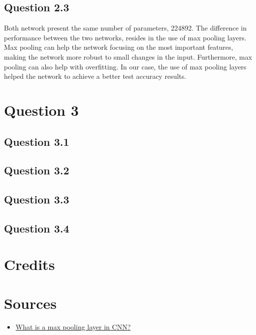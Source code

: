 \documentclass{article}
\begin{document}
\subsection{Question 2.3}
Both network present the same number of parameters, 224892.
The difference in performance between the two networks, resides in the use 
of max pooling layers. Max pooling can help the network focusing on the most
important features, making the network more robust to small changes in the
input. Furthermore, max pooling can also help with overfitting. In our case, 
the use of max pooling layers helped the network to achieve a better test 
accuracy results.

\section{Question 3}

\subsection{Question 3.1}

\subsection{Question 3.2}

\subsection{Question 3.3}

\subsection{Question 3.4}

\section{Credits}

\section{Sources}

\begin{itemize}
    \item \href{https://www.educative.io/answers/what-is-a-max-pooling-layer-in-cnn}{What is a max pooling layer in CNN?}
\end{itemize}
\end{document}
